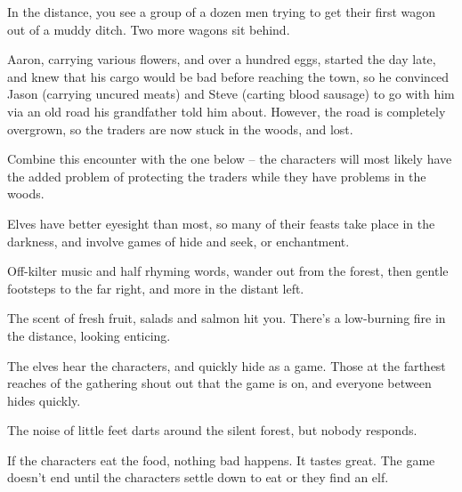 \begin{multicols}{2}
\begin{rollchart}
\end{rollchart}


\begin{boxtext}
	In the distance, you see a group of a dozen men trying to get their first wagon out of a muddy ditch.  Two more wagons sit behind.
\end{boxtext}

Aaron, carrying various flowers, and over a hundred eggs, started the day late, and knew that his cargo would be bad before reaching the town, so he convinced Jason (carrying uncured meats) and Steve (carting blood sausage) to go with him via an old road his grandfather told him about.
However, the road is completely overgrown, so the traders are now stuck in the woods, and lost.

Combine this encounter with the one below -- the characters will most likely have the added problem of protecting the traders while they have problems in the woods.



Elves have better eyesight than most, so many of their feasts take place in the darkness, and involve games of hide and seek, or enchantment.

\begin{boxtext}

	Off-kilter music and half rhyming words, wander out from the forest, then gentle footsteps to the far right, and more in the distant left.

	The scent of fresh fruit, salads and salmon hit you.  There's a low-burning fire in the distance, looking enticing.

\end{boxtext}

The elves hear the characters, and quickly hide as a game.  Those at the farthest reaches of the gathering shout out that the game is on, and everyone between hides quickly.

\begin{boxtext}

	The noise of little feet darts around the silent forest, but nobody responds.

\end{boxtext}

If the characters eat the food, nothing bad happens.  It tastes great.  The game doesn't end until the characters settle down to eat or they find an elf.


\end{multicols}
